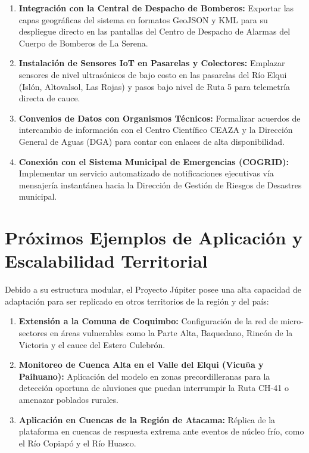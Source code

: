 \documentclass[11pt,a4paper]{article}
\begin{document}
\begin{enumerate}
    \item \textbf{Integración con la Central de Despacho de Bomberos:} Exportar las capas geográficas del sistema en formatos GeoJSON y KML para su despliegue directo en las pantallas del Centro de Despacho de Alarmas del Cuerpo de Bomberos de La Serena.
    
    \item \textbf{Instalación de Sensores IoT en Pasarelas y Colectores:} Emplazar sensores de nivel ultrasónicos de bajo costo en las pasarelas del Río Elqui (Islón, Altovalsol, Las Rojas) y pasos bajo nivel de Ruta 5 para telemetría directa de cauce.
    
    \item \textbf{Convenios de Datos con Organismos Técnicos:} Formalizar acuerdos de intercambio de información con el Centro Científico CEAZA y la Dirección General de Aguas (DGA) para contar con enlaces de alta disponibilidad.
    
    \item \textbf{Conexión con el Sistema Municipal de Emergencias (COGRID):} Implementar un servicio automatizado de notificaciones ejecutivas vía mensajería instantánea hacia la Dirección de Gestión de Riesgos de Desastres municipal.
\end{enumerate}

\section{Próximos Ejemplos de Aplicación y Escalabilidad Territorial}

Debido a su estructura modular, el Proyecto Júpiter posee una alta capacidad de adaptación para ser replicado en otros territorios de la región y del país:

\begin{enumerate}
    \item \textbf{Extensión a la Comuna de Coquimbo:} Configuración de la red de micro-sectores en áreas vulnerables como la Parte Alta, Baquedano, Rincón de la Victoria y el cauce del Estero Culebrón.
    
    \item \textbf{Monitoreo de Cuenca Alta en el Valle del Elqui (Vicuña y Paihuano):} Aplicación del modelo en zonas precordilleranas para la detección oportuna de aluviones que puedan interrumpir la Ruta CH-41 o amenazar poblados rurales.
    
    \item \textbf{Aplicación en Cuencas de la Región de Atacama:} Réplica de la plataforma en cuencas de respuesta extrema ante eventos de núcleo frío, como el Río Copiapó y el Río Huasco.
\end{enumerate}
\end{document}
